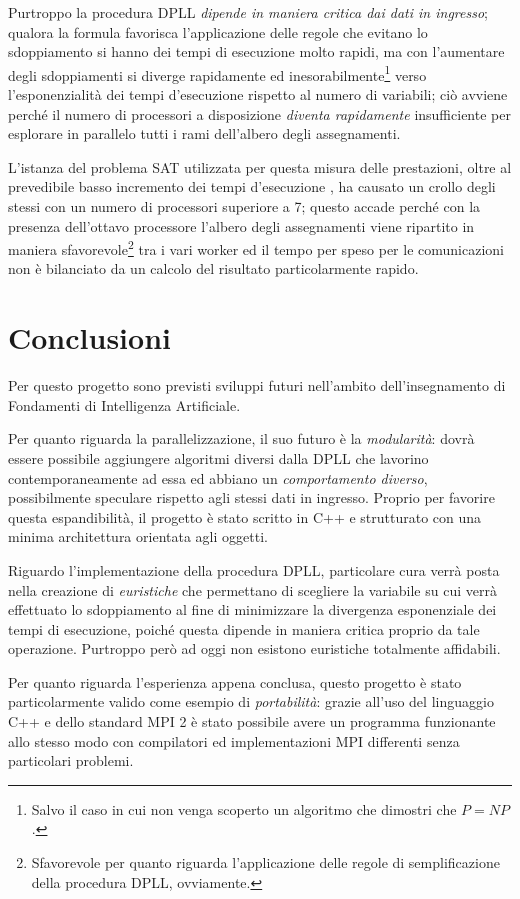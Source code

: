 \documentclass[12pt, a4paper, twosides]{report}
\begin{document}
Purtroppo la procedura DPLL \textit{dipende in maniera critica dai dati in ingresso}; qualora la formula favorisca l'applicazione delle regole che evitano lo sdoppiamento si hanno dei tempi di esecuzione molto rapidi, ma con l'aumentare degli sdoppiamenti si diverge rapidamente ed inesorabilmente\footnote{Salvo il caso in cui non venga scoperto un algoritmo che dimostri che $P=NP$.} verso l'esponenzialità dei tempi d'esecuzione rispetto al numero di variabili; ciò avviene perché il numero di processori a disposizione \textit{diventa rapidamente} insufficiente per esplorare in parallelo tutti i rami dell'albero degli assegnamenti.

L'istanza del problema SAT utilizzata per questa misura delle prestazioni, oltre al prevedibile basso incremento dei tempi d'esecuzione , ha causato un crollo degli stessi con un numero di processori superiore a 7; questo accade perché con la presenza dell'ottavo processore l'albero degli assegnamenti viene ripartito in maniera sfavorevole\footnote{Sfavorevole per quanto riguarda l'applicazione delle regole di semplificazione della procedura DPLL, ovviamente.} tra i vari worker ed il tempo per speso per le comunicazioni non è bilanciato da un calcolo del risultato particolarmente rapido.





\chapter{Conclusioni}

Per questo progetto sono previsti sviluppi futuri nell'ambito dell'insegnamento di Fondamenti di Intelligenza Artificiale.

Per quanto riguarda la parallelizzazione, il suo futuro è la \textit{modularità}: dovrà essere possibile aggiungere algoritmi diversi dalla DPLL che lavorino contemporaneamente ad essa ed abbiano un \textit{comportamento diverso}, possibilmente speculare rispetto agli stessi dati in ingresso. Proprio per favorire questa espandibilità, il progetto è stato scritto in C++ e strutturato con una minima architettura orientata agli oggetti.

Riguardo l'implementazione della procedura DPLL, particolare cura verrà posta nella creazione di \textit{euristiche} che permettano di scegliere la variabile su cui verrà effettuato lo sdoppiamento al fine di minimizzare la divergenza esponenziale dei tempi di esecuzione, poiché questa dipende in maniera critica proprio da tale operazione. Purtroppo però ad oggi non esistono euristiche totalmente affidabili.

Per quanto riguarda l'esperienza appena conclusa, questo progetto è stato particolarmente valido come esempio di \textit{portabilità}: grazie all'uso del linguaggio C++ e dello standard MPI 2 è stato possibile avere un programma funzionante allo stesso modo con compilatori ed implementazioni MPI differenti senza particolari problemi.
\end{document}
